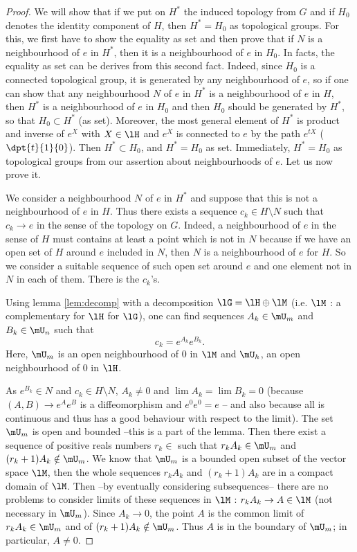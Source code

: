 \begin{proof}
We will show that if we put on $H^*$ the induced topology from $G$ and if $H_0$ denotes the identity component of $H$, then $H^*=H_0$ as topological groups. For this, we first have to show the equality as set and then prove that if $N$ is a neighbourhood of $e$ in $H^*$, then it is a neighbourhood of $e$ in $H_0$. In facts, the equality as set can be derives from this second fact. Indeed, since $H_0$ is a connected topological group, it is generated by any neighbourhood of $e$, so if one can show that any neighbourhood $N$ of $e$ in $H^*$ is a neighbourhood of $e$ in $H$, then $H^*$ is a neighbourhood of $e$ in $H_0$ and then $H_0$ should be generated by $H^*$, so that $H_0\subset H^*$ (as set). Moreover, the most general element of $H^*$ is product and inverse of $e^X$ with $X\in\lH$ and $e^X$ is connected to $e$ by the path $e^{tX}$ ($\dpt{t}{1}{0}$). Then $H^*\subset H_0$, and $H^*=H_0$ as set. Immediately, $H^*=H_0$ as topological groups from our assertion about neighbourhoods of $e$. Let us now prove it.
  
We consider a neighbourhood $N$ of $e$ in $H^*$ and suppose that this is not a neighbourhood of $e$ in $H$. Thus there exists a sequence $c_k\in H\setminus N$ such that $c_k\to e$ in the sense of the topology on $G$. Indeed, a neighbourhood of $e$ in the sense of $H$ must contains at least a point which is not in $N$ because if we have an open set of $H$ around $e$ included in $N$, then $N$ is a neighbourhood of $e$ for $H$. So we consider a suitable sequence of such open set around $e$ and one element not in $N$ in each of them. There is the $c_k$'s.

Using lemma \ref{lem:decomp} with a decomposition $\lG=\lH\oplus\lM$ (i.e. $\lM$ : a complementary for $\lH$ for $\lG$), one can find sequences $A_k\in\mU_m$ and $B_k\in\mU_n$ such that
\[
   c_k=e^{A_k}e^{B_k}.
\]
Here, $\mU_m$ is an open neighbourhood of $0$ in $\lM$ and $\mU_h$, an open neighbourhood of $0$ in $\lH$.

As $e^{B_k}\in N$ and $c_k\in H\setminus N$, $A_k\neq 0$ and $\lim A_k=\lim B_k=0$ (because $(A,B)\to e^Ae^B$ is a diffeomorphism and $e^0e^0=e$ -- and also because all is continuous and thus has a good behaviour with respect to the limit). The set $\mU_m$ is open and bounded --this is a part of the lemma. Then there exist a sequence of positive reals numbers $r_k\in$ such that $r_kA_k\in\mU_m$ and $(r_k+1)A_k\notin\mU_m$. We know that $\mU_m$ is a bounded open subset of the vector space $\lM$, then the whole sequences $r_kA_k$ and $(r_k+1)A_k$ are in a compact domain of $\lM$. Then --by eventually considering subsequences-- there are no problems to consider limits of these sequences in $\lM$ : $r_kA_k\to A\in\lM$ (not necessary in $\mU_m$). Since $A_k\to 0$, the point $A$ is the common limit of $r_kA_k\in\mU_m$ and of $(r_k+1)A_k\notin\mU_m$. Thus $A$ is in the boundary of $\mU_m$; in particular, $A\neq 0$.


\end{proof}
